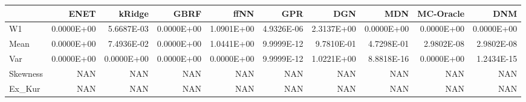 \begin{tabular}{lrrrrrrrrr}
\toprule
{} &       ENET &     kRidge &       GBRF &       ffNN &        GPR &        DGN &        MDN &  MC-Oracle &        DNM \\
\midrule
W1       & 0.0000E+00 & 5.6687E-03 & 0.0000E+00 & 1.0901E+00 & 4.9326E-06 & 2.3137E+00 & 0.0000E+00 & 0.0000E+00 & 0.0000E+00 \\
Mean     & 0.0000E+00 & 7.4936E-02 & 0.0000E+00 & 1.0441E+00 & 9.9999E-12 & 9.7810E-01 & 4.7298E-01 & 2.9802E-08 & 2.9802E-08 \\
Var      & 0.0000E+00 & 0.0000E+00 & 0.0000E+00 & 0.0000E+00 & 9.9999E-12 & 1.0221E+00 & 8.8818E-16 & 0.0000E+00 & 1.2434E-15 \\
Skewness &        NAN &        NAN &        NAN &        NAN &        NAN &        NAN &        NAN &        NAN &        NAN \\
Ex\_Kur   &        NAN &        NAN &        NAN &        NAN &        NAN &        NAN &        NAN &        NAN &        NAN \\
\bottomrule
\end{tabular}
